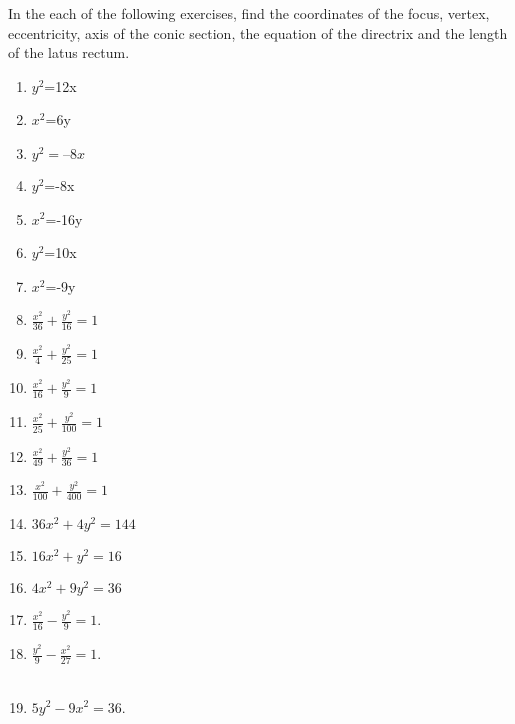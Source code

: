 In the each of the following exercises, find the coordinates of the focus, vertex, eccentricity, axis of the conic section, the equation of the directrix and the length of the latus rectum.
\begin{enumerate}[label=\thesubsection.\arabic*,ref=\thesubsection.\theenumi]
\item $y^2$=12x 
\label{chapters/11/11/2/1}
\\
\solution
\item $x^2$=6y 
\\
\solution
\item 
$y^2 = –8x$
\\
\solution
\item $y^2$=-8x

\item $x^2$=-16y
\\
\solution

\item $y^2$=10x  

\item $x^2$=-9y  
  \item $\frac{x^2}{36}+\frac{y^2}{16}=1$
\\
\solution
%
  \item $\frac{x^2}{4}+\frac{y^2}{25}=1$
\\
\solution
%
  \item $\frac{x^2}{16}+\frac{y^2}{9}=1$
\\
\solution
%
  \item $\frac{x^2}{25}+\frac{y^2}{100}=1$
  \item $\frac{x^2}{49}+\frac{y^2}{36}=1$
  \item $\frac{x^2}{100}+\frac{y^2}{400}=1$
  \item $36x^2+4y^2=144$
  \item $16x^2+y^2=16$
  \item $4x^2+9y^2=36$
	\item $\frac{x^2}{16}-\frac{y^2}{9} = 1$. \\ 
		\solution
	\item $\frac{y^2}{9}-\frac{x^2}{27}=1$.
		\\
		\solution
		\\
	\item $5{y^2}-9{x^2}=36$.
		\\
		\solution
		\\
\end{enumerate}

